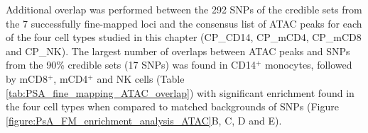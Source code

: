 Additional overlap was performed between the 292 SNPs of the credible sets from the 7 successfully fine-mapped loci and the consensus list of ATAC peaks for each of the four cell types studied in this chapter (CP\_CD14, CP\_mCD4, CP\_mCD8 and CP\_NK). The largest number of overlaps between ATAC peaks and SNPs from the 90\% credible sets (17 SNPs) was found in CD14$^+$ monocytes, followed by mCD8$^+$, mCD4$^+$ and NK cells (Table \ref{tab:PSA_fine_mapping_ATAC_overlap}) with significant enrichment found in the four cell types when compared to matched backgrounds of SNPs (Figure \ref{figure:PsA_FM_enrichment_analysis_ATAC}B, C, D and E). %





